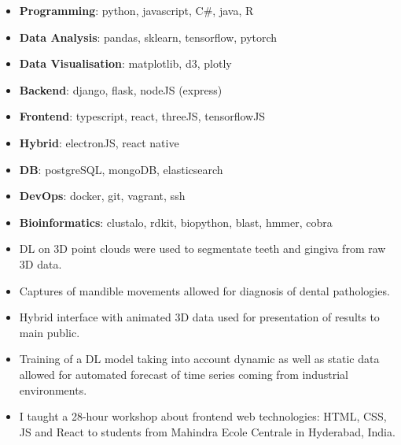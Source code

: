 
\begin{itemize}
  \item \textbf{Programming}: python, javascript, C\#, java, R
  \item \textbf{Data Analysis}: pandas, sklearn, tensorflow, pytorch
  \item \textbf{Data Visualisation}: matplotlib, d3, plotly
  \item \textbf{Backend}: django, flask, nodeJS (express)
  \item \textbf{Frontend}: typescript, react, threeJS, tensorflowJS
  \item \textbf{Hybrid}: electronJS, react native
  \item \textbf{DB}: postgreSQL, mongoDB, elasticsearch
  \item \textbf{DevOps}: docker, git, vagrant, ssh
  \item \textbf{Bioinformatics}: clustalo, rdkit, biopython, blast, hmmer, cobra
\end{itemize}





\begin{itemize}
  \item DL on 3D point clouds were used to segmentate teeth and gingiva from raw 3D data.
  \item Captures of mandible movements allowed for diagnosis of dental pathologies.
  \item Hybrid interface with animated 3D data used for presentation of results to main public.
\end{itemize}

\begin{itemize}
  \item Training of a DL model taking into account dynamic as well as static data allowed for automated forecast of time series coming from industrial environments.
\end{itemize}

\begin{itemize}
  \item I taught a 28-hour workshop about frontend web technologies: HTML, CSS, JS and React to students from Mahindra Ecole Centrale in Hyderabad, India.
\end{itemize}


